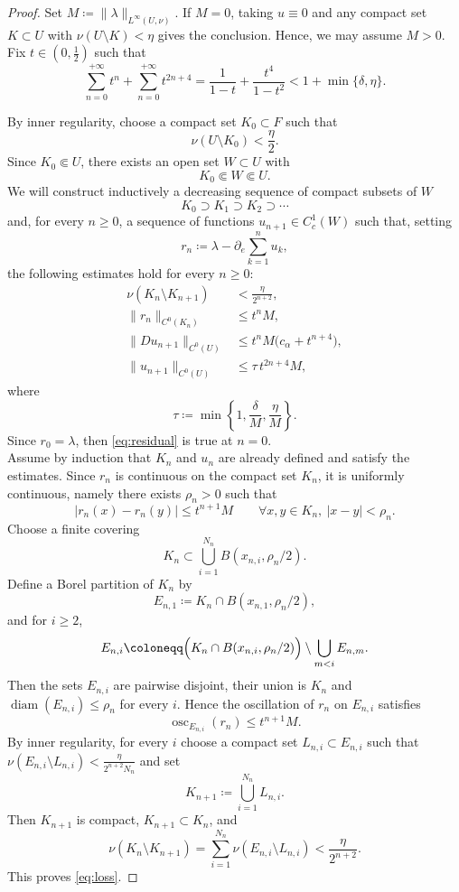 \documentclass[11pt,a4paper]{article}
\newcommand{\osc}{\operatorname{osc}}
\newcommand{\diam}{\operatorname{diam}}
\theoremstyle{definition}
\theoremstyle{remark}
\begin{document}
\begin{proof}
 Set $M \coloneqq \|\lambda\|_{L^\infty(U,\nu)}$.
If $M=0$, taking $u\equiv 0$ and any compact set $K\subset U$ with $\nu(U\setminus K)<\eta$ gives the conclusion.
Hence, we may assume $M>0$.
Fix $t\in \left(0,\frac{1}{2}\right)$ such that
\begin{equation}\label{eq:t_geom_piccola}
    \sum_{n=0}^{+\infty}t^n + \sum_{n=0}^{+\infty}t^{2n+4} =\frac{1}{1-t} + \frac{t^4}{1-t^2}< 1+\min\{\delta,\eta\}.
\end{equation}

By inner regularity, choose a compact set $K_0\subset F$ such that
$$
\nu(U\setminus K_0)<\frac{\eta}{2}.
$$
Since $K_0\Subset U$, there exists an open set $W\subset U$ with
$$
K_0\Subset W\Subset U.
$$
We will construct inductively a decreasing sequence of compact subsets of $W$
$$
K_0\supset K_1\supset K_2\supset\cdots
$$
and, for every $n\geq 0$, a sequence of functions $u_{n+1}\in C^1_c(W)$
such that, setting
$$
r_n\coloneqq \lambda-\partial_e \sum_{k=1}^n u_k,
$$
the following estimates hold for every $n\ge 0$:
\begin{align}
\nu(K_n\setminus K_{n+1}) &< \frac{\eta}{2^{n+2}}, \label{eq:loss}\\
\|r_n\|_{C^0(K_n)} &\le t^n M, \label{eq:residual}\\
\|Du_{n+1}\|_{C^0(U)} &\le t^n M\bigl(c_\alpha+t^{n+4}\bigr), \label{eq:gradstep}\\
\|u_{n+1}\|_{C^0(U)} &\le \tau\,t^{2n+4}M, \label{eq:supstep}
\end{align}
where
$$
\tau\coloneqq \min\left\{1,\frac{\delta}{M}, \frac{\eta}{M}\right\}.
$$
Since $r_0=\lambda$, then \eqref{eq:residual} is true at $n=0$.\\

Assume by induction that $K_n$ and $u_n$ are already defined and satisfy the estimates.
Since $r_n$ is continuous on the compact set $K_n$, it is uniformly continuous, namely there exists $\rho_n>0$ such that
$$
|r_n(x)-r_n(y)|\le t^{n+1}M
\qquad\forall x,y\in K_n,\ |x-y|<\rho_n.
$$
Choose a finite covering
$$
K_n\subset \bigcup_{i=1}^{N_n} B(x_{n,i},\rho_n/2).
$$
Define a Borel partition of $K_n$ by
$$
E_{n,1}\coloneqq K_n\cap B(x_{n,1},\rho_n/2),
$$
and for $i\ge 2$,
$$
E_{n,i}\coloneqq \Bigl(K_n\cap B(x_{n,i},\rho_n/2)\Bigr)\setminus \bigcup_{m<i}E_{n,m}.
$$
Then the sets $E_{n,i}$ are pairwise disjoint, their union is $K_n$ and $\diam(E_{n,i})\leq \rho_n$ for every $i$.
Hence the oscillation of $r_n$ on $E_{n,i}$ satisfies
$$
\osc_{E_{n,i}}(r_n)\le t^{n+1}M.
$$
By inner regularity, for every $i$ choose a compact set $L_{n,i}\subset E_{n,i}$ such that $\nu(E_{n,i}\setminus L_{n,i})<\frac{\eta}{2^{n+2}N_n}$ and set
$$
K_{n+1}\coloneqq \bigcup_{i=1}^{N_n}L_{n,i}.
$$
Then $K_{n+1}$ is compact, $K_{n+1}\subset K_n$, and
$$
\nu(K_n\setminus K_{n+1})
=\sum_{i=1}^{N_n}\nu(E_{n,i}\setminus L_{n,i})
< \frac{\eta}{2^{n+2}}.
$$
This proves \eqref{eq:loss}.


\end{proof}
\end{document}

